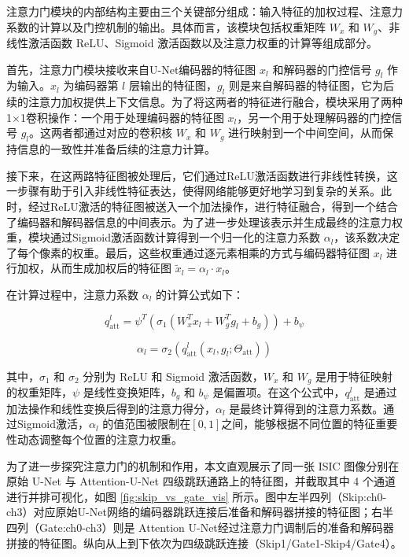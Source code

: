 注意力门模块的内部结构主要由三个关键部分组成：输入特征的加权过程、注意力系数的计算以及门控机制的输出。具体而言，该模块包括权重矩阵 $W_x$ 和 $W_g$、非线性激活函数 ReLU、Sigmoid 激活函数以及注意力权重的计算等组成部分。

首先，注意力门模块接收来自U-Net编码器的特征图 $x_l$ 和解码器的门控信号 $g_l$ 作为输入。$x_l$ 为编码器第 $l$ 层输出的特征图，$g_l$ 则是来自解码器的特征图，它为后续的注意力加权提供上下文信息。为了将这两者的特征进行融合，模块采用了两种1×1卷积操作：一个用于处理编码器的特征图 $x_l$，另一个用于处理解码器的门控信号 $g_l$。这两者都通过对应的卷积核 $W_x$ 和 $W_g$ 进行映射到一个中间空间，从而保持信息的一致性并准备后续的注意力计算。

接下来，在这两路特征图被处理后，它们通过ReLU激活函数进行非线性转换，这一步骤有助于引入非线性特征表达，使得网络能够更好地学习到复杂的关系。此时，经过ReLU激活的特征图被送入一个加法操作，进行特征融合，得到一个结合了编码器和解码器信息的中间表示。为了进一步处理该表示并生成最终的注意力权重，模块通过Sigmoid激活函数计算得到一个归一化的注意力系数 $\alpha_l$，该系数决定了每个像素的权重。最后，这些权重通过逐元素相乘的方式与编码器特征图 $x_l$ 进行加权，从而生成加权后的特征图 $\tilde{x}_l = \alpha_l \cdot x_l$。

在计算过程中，注意力系数 $\alpha_l$ 的计算公式如下：

\begin{equation}
    q_{\text{att}}^l = \psi^T \left( \sigma_1 (W_x^T x_l + W_g^T g_l + b_g) \right) + b_\psi
\end{equation}

\begin{equation}
    \alpha_l = \sigma_2 \left( q_{\text{att}}^l(x_l, g_l; \Theta_{\text{att}}) \right)
\end{equation}

其中，$\sigma_1$ 和 $\sigma_2$ 分别为 ReLU 和 Sigmoid 激活函数，$W_x$ 和 $W_g$ 是用于特征映射的权重矩阵，$\psi$ 是线性变换矩阵，$b_g$ 和 $b_\psi$ 是偏置项。在这个公式中，$q_{\text{att}}^l$ 是通过加法操作和线性变换后得到的注意力得分，$\alpha_l$ 是最终计算得到的注意力系数。通过Sigmoid激活，$\alpha_l$ 的值范围被限制在$[0, 1]$之间，能够根据不同位置的特征重要性动态调整每个位置的注意力权重。

为了进一步探究注意力门的机制和作用，本文直观展示了同一张 ISIC 图像分别在原始 U-Net 与 Attention-U-Net 四级跳跃通路上的特征图，并截取其中 4 个通道进行并排可视化，如图 \ref{fig:skip_vs_gate_vis} 所示。图中左半四列（Skip:ch0-ch3）对应原始U-Net网络的编码器跳跃连接后准备和解码器拼接的特征图；右半四列（Gate:ch0-ch3）则是 Attention U-Net经过注意力门调制后的准备和解码器拼接的特征图。纵向从上到下依次为四级跳跃连接（Skip1/Gate1-Skip4/Gate4）。

